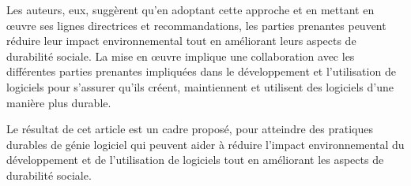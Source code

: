 Les auteurs, eux, suggèrent qu’en adoptant cette approche et en mettant en œuvre ses lignes directrices et recommandations, les parties prenantes peuvent réduire leur impact environnemental tout en améliorant leurs aspects de durabilité sociale. La mise en œuvre implique une collaboration avec les différentes parties prenantes impliquées dans le développement et l’utilisation de logiciels pour s’assurer qu’ils créent, maintiennent et utilisent des logiciels d’une manière plus durable.

Le résultat de cet article est un cadre proposé, pour atteindre des pratiques durables de génie logiciel qui peuvent aider à réduire l’impact environnemental du développement et de l’utilisation de logiciels tout en améliorant les aspects de durabilité sociale.
